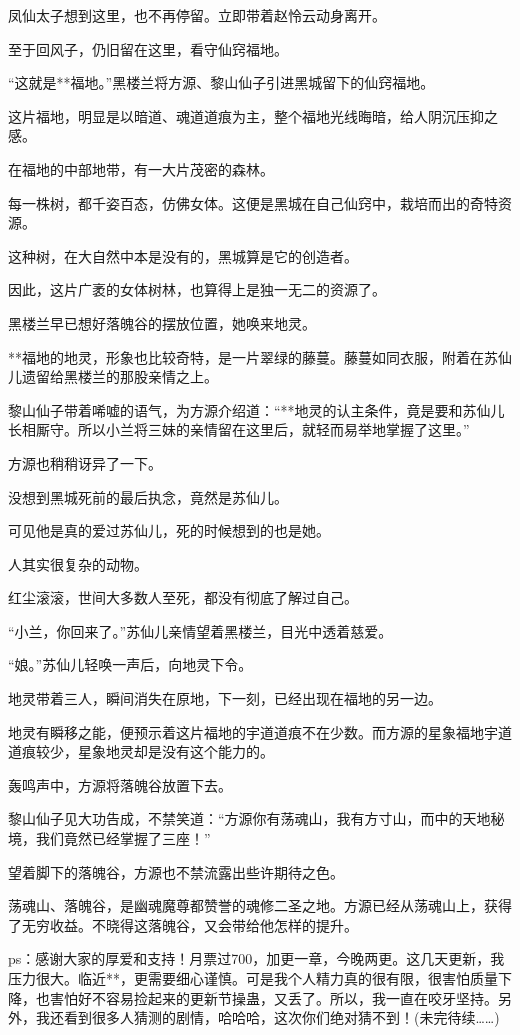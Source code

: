 \begin{this_body}
凤仙太子想到这里，也不再停留。立即带着赵怜云动身离开。

至于回风子，仍旧留在这里，看守仙窍福地。

“这就是**福地。”黑楼兰将方源、黎山仙子引进黑城留下的仙窍福地。

这片福地，明显是以暗道、魂道道痕为主，整个福地光线晦暗，给人阴沉压抑之感。

在福地的中部地带，有一大片茂密的森林。

每一株树，都千姿百态，仿佛女体。这便是黑城在自己仙窍中，栽培而出的奇特资源。

这种树，在大自然中本是没有的，黑城算是它的创造者。

因此，这片广袤的女体树林，也算得上是独一无二的资源了。

黑楼兰早已想好落魄谷的摆放位置，她唤来地灵。

**福地的地灵，形象也比较奇特，是一片翠绿的藤蔓。藤蔓如同衣服，附着在苏仙儿遗留给黑楼兰的那股亲情之上。

黎山仙子带着唏嘘的语气，为方源介绍道：“**地灵的认主条件，竟是要和苏仙儿长相厮守。所以小兰将三妹的亲情留在这里后，就轻而易举地掌握了这里。”

方源也稍稍讶异了一下。

没想到黑城死前的最后执念，竟然是苏仙儿。

可见他是真的爱过苏仙儿，死的时候想到的也是她。

人其实很复杂的动物。

红尘滚滚，世间大多数人至死，都没有彻底了解过自己。

“小兰，你回来了。”苏仙儿亲情望着黑楼兰，目光中透着慈爱。

“娘。”苏仙儿轻唤一声后，向地灵下令。

地灵带着三人，瞬间消失在原地，下一刻，已经出现在福地的另一边。

地灵有瞬移之能，便预示着这片福地的宇道道痕不在少数。而方源的星象福地宇道道痕较少，星象地灵却是没有这个能力的。

轰鸣声中，方源将落魄谷放置下去。

黎山仙子见大功告成，不禁笑道：“方源你有荡魂山，我有方寸山，而中的天地秘境，我们竟然已经掌握了三座！”

望着脚下的落魄谷，方源也不禁流露出些许期待之色。

荡魂山、落魄谷，是幽魂魔尊都赞誉的魂修二圣之地。方源已经从荡魂山上，获得了无穷收益。不晓得这落魄谷，又会带给他怎样的提升。

ps：感谢大家的厚爱和支持！月票过700，加更一章，今晚两更。这几天更新，我压力很大。临近**，更需要细心谨慎。可是我个人精力真的很有限，很害怕质量下降，也害怕好不容易捡起来的更新节操蛊，又丢了。所以，我一直在咬牙坚持。另外，我还看到很多人猜测的剧情，哈哈哈，这次你们绝对猜不到！(未完待续……)

\end{this_body}

